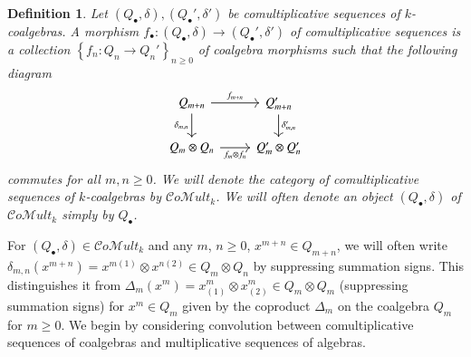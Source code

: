 \documentclass[10pt, colorlinks]{article}
\numberwithin{equation}{section} \DeclareMathSizes{2}{10}{12}{13}
\newtheorem{defn}[thm]{Definition}
\begin{document}
\begin{defn}
        \smallskip
Let $(Q_\bullet,\delta),(Q_\bullet',\delta')$ be comultiplicative sequences of $k$-coalgebras. A morphism $f_\bullet:(Q_\bullet,\delta)\longrightarrow (Q_\bullet',\delta')$ of comultiplicative sequences is a collection $\left\{f_n:Q_n\longrightarrow Q_n'\right\}_{n\geq 0}$ of coalgebra morphisms such that the following diagram
\begin{equation}\label{diag6.2p}
\begin{tikzcd}
Q_{m+n}
\arrow[r, "f_{m+n} "]
\arrow[d, "\delta_{m,n}"']
& Q'_{m+n}  \arrow[d, "\delta_{m,n}'"] \\
Q_m \otimes Q_n
\arrow[r, "f_m\otimes f_n"']
&  Q_m' \otimes Q_n'
\end{tikzcd}
\end{equation}
commutes for all $m,n\geq 0$. We will denote the category of comultiplicative sequences of $k$-coalgebras by $\mathcal Co\mathscr Mult_k$. We will often denote an object $(Q_\bullet,\delta)$ of $\mathcal Co\mathscr Mult_k$ simply by $Q_\bullet$.
    \end{defn}

For $(Q_\bullet,\delta)\in \mathcal Co\mathscr Mult_k$ and any $m$, $n\geq 0$,  $x^{m+n}\in Q_{m+n}$, we will often write $\delta_{m,n}(x^{m+n})=x^{m(1)}\otimes x^{n(2)}\in Q_m\otimes Q_n$ by suppressing summation signs. This distinguishes it from $\Delta_m(x^m)=x^m_{(1)}\otimes x^m_{(2)}\in Q_m\otimes Q_m$ (suppressing summation signs) for $x^m\in Q_m$ given by the coproduct $\Delta_m$ on the coalgebra $Q_m$ for $m\geq 0$. We begin by considering convolution between comultiplicative sequences of coalgebras and multiplicative sequences of algebras.

    
\end{document}
